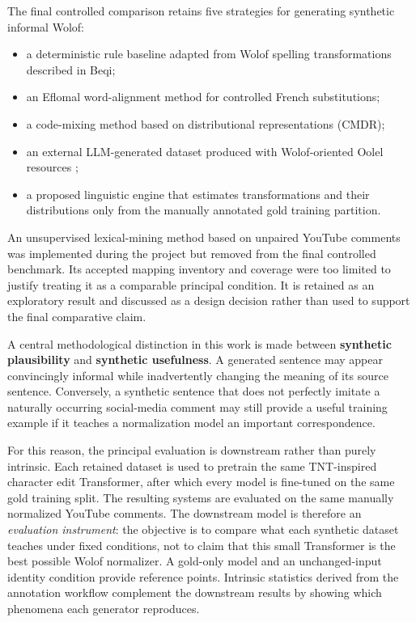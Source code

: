 \documentclass[12pt, a4paper, twoside, openany]{report}
\begin{document}
The final controlled comparison retains five strategies for generating synthetic informal Wolof:

\begin{itemize}[noitemsep]
	\item a deterministic rule baseline adapted from Wolof spelling transformations described in Beqi;
	\item an Eflomal word-alignment method for controlled French substitutions;
	\item a code-mixing method based on distributional representations (CMDR);
	\item an external \ac{LLM}-generated dataset produced with Wolof-oriented Oolel resources \cite{soynade2026oolel};
	\item a proposed linguistic engine that estimates transformations and their distributions only from the manually annotated gold training partition.
\end{itemize}

An unsupervised lexical-mining method based on unpaired YouTube comments was implemented during the project but removed from the final controlled benchmark. Its accepted mapping inventory and coverage were too limited to justify treating it as a comparable principal condition. It is retained as an exploratory result and discussed as a design decision rather than used to support the final comparative claim.

A central methodological distinction in this work is made between \textbf{synthetic plausibility} and \textbf{synthetic usefulness}. A generated sentence may appear convincingly informal while inadvertently changing the meaning of its source sentence. Conversely, a synthetic sentence that does not perfectly imitate a naturally occurring social-media comment may still provide a useful training example if it teaches a normalization model an important correspondence.

For this reason, the principal evaluation is downstream rather than purely intrinsic. Each retained dataset is used to pretrain the same TNT-inspired character edit Transformer, after which every model is fine-tuned on the same gold training split. The resulting systems are evaluated on the same manually normalized YouTube comments. The downstream model is therefore an \emph{evaluation instrument}: the objective is to compare what each synthetic dataset teaches under fixed conditions, not to claim that this small Transformer is the best possible Wolof normalizer. A gold-only model and an unchanged-input identity condition provide reference points. Intrinsic statistics derived from the annotation workflow complement the downstream results by showing which phenomena each generator reproduces.
\end{document}
